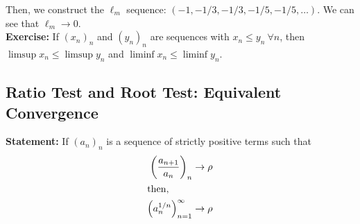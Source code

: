 \documentclass[10pt]{extarticle}
\begin{document}
    Then, we construct the $\ell_m$ sequence: $(-1,-1/3,-1/3,-1/5,-1/5,\dots)$. We can see that $\ell_m\rightarrow 0$.\\

    \textbf{Exercise:} If $(x_n)_n$ and $(y_n)_n$ are sequences with $x_n \leq y_n~\forall n$, then $\limsup x_n \leq \limsup y_n$ and $\liminf x_n \leq \liminf y_n$.
  \subsection{Ratio Test and Root Test: Equivalent Convergence}%
  \textbf{Statement:} If $(a_n)_n$ is a sequence of strictly positive terms such that
    \begin{align*}
      \left(\frac{a_{n+1}}{a_n}\right)_n &\rightarrow \rho\\
      \shortintertext{then,}
      \left(a_n^{1/n}\right)_{n=1}^{\infty} &\rightarrow \rho
    \end{align*}
\end{document}
